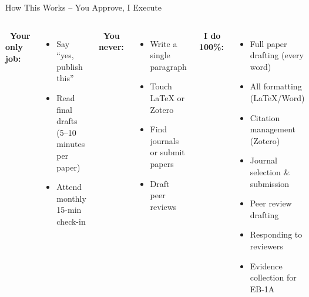 \documentclass[aspectratio=169, 10pt]{beamer}
\begin{document}
\begin{frame}{How This Works – You Approve, I Execute}
	\begin{columns}[T]
		\textbf{\faCheckCircle \ Your only job:}
		\begin{itemize}
			\item Say “yes, publish this”
			\item Read final drafts (5–10 minutes per paper)
			\item Attend monthly 15-min check-in
		\end{itemize}
		
		\vspace{0.5cm}
		\textbf{\faTimesCircle \ You never:}
		\begin{itemize}
			\item Write a single paragraph
			\item Touch LaTeX or Zotero
			\item Find journals or submit papers
			\item Draft peer reviews
		\end{itemize}
		
		\textbf{\faRobot \ I do 100\%:}
		\begin{itemize}
			\item Full paper drafting (every word)
			\item All formatting (LaTeX/Word)
			\item Citation management (Zotero)
			\item Journal selection \& submission
			\item Peer review drafting
			\item Responding to reviewers
			\item Evidence collection for EB-1A
		\end{itemize}
	\end{columns}
	
	\vspace{0.3cm}
	\centering
\end{frame}
	
\end{document}
